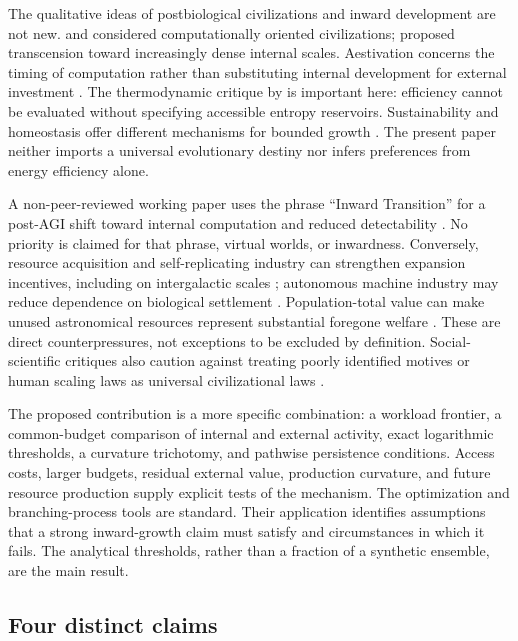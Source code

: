 \documentclass[11pt,a4paper]{article}
\theoremstyle{definition}\newtheorem{definition}{Definition}
\begin{document}
The qualitative ideas of postbiological civilizations and inward development are not new. \citet{Dick2003} and \citet{CirkovicBradbury2006} considered computationally oriented civilizations; \citet{Smart2012} proposed transcension toward increasingly dense internal scales. Aestivation concerns the timing of computation rather than substituting internal development for external investment \citep{Sandberg2017}. The thermodynamic critique by \citet{BennettHansonRiedel2019} is important here: efficiency cannot be evaluated without specifying accessible entropy reservoirs. Sustainability and homeostasis offer different mechanisms for bounded growth \citep{HaqqMisraBaum2009,WongBartlett2022}. The present paper neither imports a universal evolutionary destiny nor infers preferences from energy efficiency alone.

A non-peer-reviewed working paper uses the phrase ``Inward Transition'' for a post-AGI shift toward internal computation and reduced detectability \citep{Pitti2026}. No priority is claimed for that phrase, virtual worlds, or inwardness. Conversely, resource acquisition and self-replicating industry can strengthen expansion incentives, including on intergalactic scales \citep{ArmstrongSandberg2013}; autonomous machine industry may reduce dependence on biological settlement \citep{Ivliev2026}. Population-total value can make unused astronomical resources represent substantial foregone welfare \citep{Bostrom2003Waste}. These are direct counterpressures, not exceptions to be excluded by definition. Social-scientific critiques also caution against treating poorly identified motives or human scaling laws as universal civilizational laws \citep{Shkurko2024,JacksonCriadoPerez2024}.

The proposed contribution is a more specific combination: a workload frontier, a common-budget comparison of internal and external activity, exact logarithmic thresholds, a curvature trichotomy, and pathwise persistence conditions. Access costs, larger budgets, residual external value, production curvature, and future resource production supply explicit tests of the mechanism. The optimization and branching-process tools are standard. Their application identifies assumptions that a strong inward-growth claim must satisfy and circumstances in which it fails. The analytical thresholds, rather than a fraction of a synthetic ensemble, are the main result.

\subsection{Four distinct claims}
\end{document}
